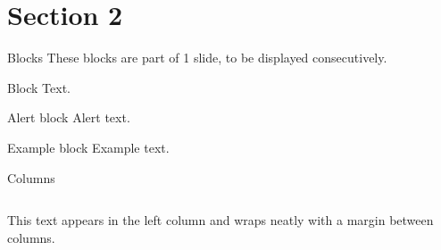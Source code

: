 \section{Section 2}


\begin{frame}{Blocks}
	These blocks are part of 1 slide, to be displayed consecutively.
	\begin{block}{Block}
		Text.
	\end{block}
	\pause %
	\begin{alertblock}{Alert block}
		Alert \alert{text}.
	\end{alertblock}
	\pause %
	\begin{exampleblock}{Example block}
		Example \textcolor{example}{text}.
	\end{exampleblock}
\end{frame}


\begin{frame}{Columns}
	\begin{columns}
		This text appears in the left column and wraps neatly with a margin between columns.
		\noindent{}
	\end{columns}
\end{frame}


